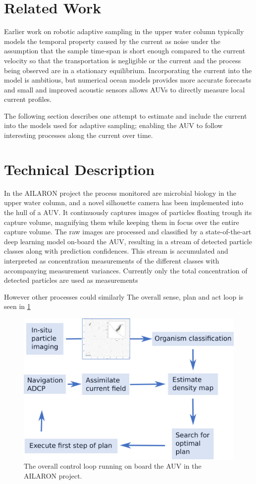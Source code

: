 \documentclass[conference]{IEEEtran}
\begin{document}
\section{Related Work}
Earlier work on robotic adaptive sampling in the upper water column typically models the temporal property caused by the current as noise under the assumption that the sample time-span is short enough compared to the current velocity so that the transportation is negligible or the current and the process being observed are in a stationary equilibrium.
Incorporating the current into the model is ambitious, but numerical ocean models provides more accurate forecasts and small and improved acoustic sensors allows AUVs to directly measure local current profiles.


The following section describes one attempt to estimate and include the current into the models used for adaptive sampling; enabling the AUV to follow interesting processes along the current over time.

\section{Technical Description}
In the AILARON project the process monitored are microbial biology in the upper water column, and a novel silhouette camera has been implemented into the hull of a AUV.
It continuously captures images of particles floating trough its capture volume, magnifying them while keeping them in focus over the entire capture volume.
The raw images are processed and classified by a state-of-the-art deep learning model on-board the AUV, resulting in a stream of detected particle classes along with prediction confidences.
This stream is accumulated and interpreted as concentration measurements of the different classes with accompanying measurement variances.
Currently only the total concentration of detected particles are used as measurements

However other processes could similarly 
The overall sense, plan and act loop is seen in \cref{fig:sensePlanActLoop}

\begin{figure}[tbp]
\centerline{\includegraphics[width=\linewidth]{figures/workflow-simplified.png}}
\caption{The overall control loop running on board the AUV in the AILARON project.}
\label{fig:sensePlanActLoop}
\end{figure}
\end{document}
